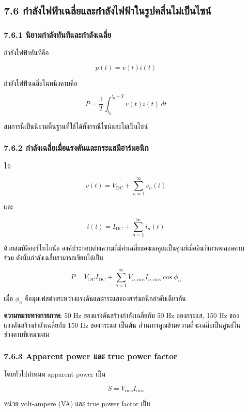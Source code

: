 \subsection{7.6 กำลังไฟฟ้าเฉลี่ยและกำลังไฟฟ้าในรูปคลื่นไม่เป็นไซน์}

\subsubsection{7.6.1 นิยามกำลังทันทีและกำลังเฉลี่ย}

กำลังไฟฟ้าทันทีคือ

\[
p(t)=v(t)i(t)
\]

กำลังไฟฟ้าเฉลี่ยในหนึ่งคาบคือ

\[
P=\frac{1}{T}\int_{t_0}^{t_0+T}v(t)i(t)\,dt
\]

สมการนี้เป็นนิยามพื้นฐานที่ใช้ได้ทั้งกรณีไซน์และไม่เป็นไซน์

\subsubsection{7.6.2 กำลังเฉลี่ยเมื่อแรงดันและกระแสมีฮาร์มอนิก}

ให้

\[
v(t)=V_{\mathrm{DC}}+\sum_{n=1}^{\infty}v_n(t)
\]

และ

\[
i(t)=I_{\mathrm{DC}}+\sum_{n=1}^{\infty}i_n(t)
\]

ด้วยสมบัติออร์โทโกนัล องค์ประกอบต่างความถี่มีค่าเฉลี่ยของผลคูณเป็นศูนย์เมื่ออินทิเกรตตลอดคาบร่วม ดังนั้นกำลังเฉลี่ยสามารถเขียนได้เป็น

\[
P=V_{\mathrm{DC}}I_{\mathrm{DC}}+\sum_{n=1}^{\infty}V_{n,\mathrm{rms}}I_{n,\mathrm{rms}}\cos\phi_n
\]

เมื่อ $\phi_n$ คือมุมเฟสต่างระหว่างแรงดันและกระแสของฮาร์มอนิกลำดับเดียวกัน

\textbf{ความหมายทางกายภาพ:} 50 Hz ของแรงดันสร้างกำลังเฉลี่ยกับ 50 Hz ของกระแส, 150 Hz ของแรงดันสร้างกำลังเฉลี่ยกับ 150 Hz ของกระแส เป็นต้น ส่วนการคูณข้ามความถี่จะเฉลี่ยเป็นศูนย์ในช่วงคาบที่เหมาะสม

\subsubsection{7.6.3 Apparent power และ true power factor}

โดยทั่วไปกำหนด apparent power เป็น

\[
S=V_{\mathrm{rms}}I_{\mathrm{rms}}
\]

หน่วย volt-ampere (VA) และ true power factor เป็น

